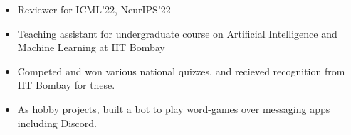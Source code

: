 
\begin{itemize}
    \item Reviewer for ICML'22, NeurIPS'22
    \item Teaching assistant for undergraduate course on Artificial Intelligence and Machine Learning at IIT Bombay
    \item Competed and won various national quizzes, and recieved recognition from IIT Bombay for these.
    \item As hobby projects, built a bot to play word-games over messaging apps including Discord.
\end{itemize}
\vspace{-4mm}